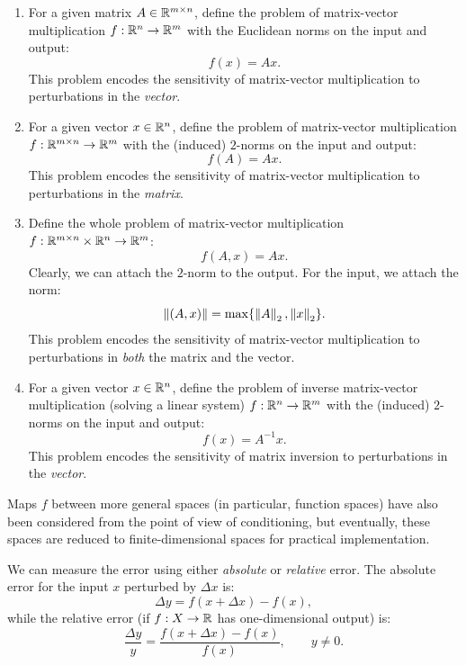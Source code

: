 \begin{example}
\begin{enumerate}
\item For a given matrix $A\in\mathbb{R}^{m\times n}$, define the problem of matrix-vector multiplication $f:\mathbb{R}^n\to\mathbb{R}^m$ with the Euclidean norms on the input and output:
\begin{equation}
f(x) = Ax.
\end{equation}
This problem encodes the sensitivity of matrix-vector multiplication to perturbations in the {\em vector}.
\item For a given vector $x\in\mathbb{R}^n$, define the problem of matrix-vector multiplication $f:\mathbb{R}^{m\times n}\to\mathbb{R}^m$ with the (induced) $2$-norms on the input and output:
\begin{equation}
f(A) = Ax.
\end{equation}
This problem encodes the sensitivity of matrix-vector multiplication to perturbations in the {\em matrix}.
\item Define the whole problem of matrix-vector multiplication $f:\mathbb{R}^{m\times n}\times\mathbb{R}^n\to\mathbb{R}^m$:
\begin{equation}
f(A,x) = Ax.
\end{equation}
Clearly, we can attach the $2$-norm to the output. For the input, we attach the norm:
\begin{equation}
\left\|{(A,x)}\right\| = \max\{\left\|{A}\right\|_2,\left\|{x}\right\|_2\}.
\end{equation}
This problem encodes the sensitivity of matrix-vector multiplication to perturbations in {\em both} the matrix and the vector.
\item For a given vector $x\in\mathbb{R}^n$, define the problem of inverse matrix-vector multiplication (solving a linear system) $f:\mathbb{R}^n\to\mathbb{R}^m$ with the (induced) $2$-norms on the input and output:
\begin{equation}
f(x) = A^{-1}x.
\end{equation}
This problem encodes the sensitivity of matrix inversion to perturbations in the {\em vector}.
\end{enumerate}
\end{example}

Maps $f$ between more general spaces (in particular, function spaces) have also been considered from the point of view of conditioning, but eventually, these spaces are reduced to finite-dimensional spaces for practical implementation.

We can measure the error using either {\em absolute} or {\em relative} error. The absolute error for the input $x$ perturbed by $\Delta x$ is:
\begin{equation}
\Delta y = f(x+\Delta x) - f(x),
\end{equation}
while the relative error (if $f:X\to\mathbb{R}$ has one-dimensional output) is:
\begin{equation}
\dfrac{\Delta y}{y} = \dfrac{f(x+\Delta x)-f(x)}{f(x)},\qquad y\ne 0.
\end{equation}

